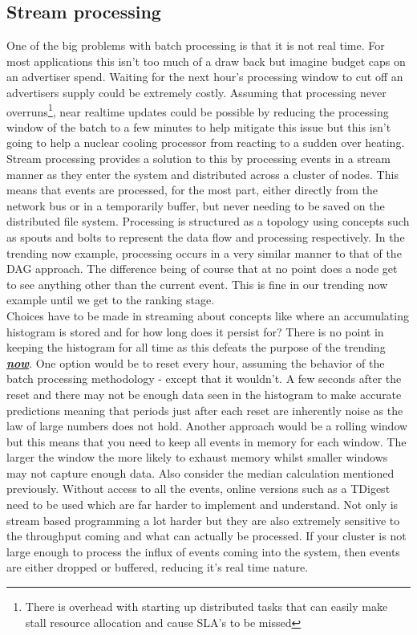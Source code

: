 \documentclass[a4paper,11pt]{scrreprt}
\begin{document}
\subsection{Stream processing}
One of the big problems with batch processing is that it is not real time. For most applications this isn't too much of a draw back but imagine budget caps on an advertiser spend. Waiting for the next hour's processing window to cut off an advertisers supply could be extremely costly. Assuming that processing never overruns\footnote{There is overhead with starting up distributed tasks that can easily make stall resource allocation and cause SLA's to be missed}, near realtime updates could be possible by reducing the processing window of the batch to a few minutes to help mitigate this issue but this isn't going to help a nuclear cooling processor from reacting to a sudden over heating. Stream processing provides a solution to this by processing events in a stream manner as they enter the system and distributed across a cluster of nodes. This means that events are processed, for the most part, either directly from the network bus or in a temporarily buffer, but never needing to be saved on the distributed file system. Processing is structured as a topology using concepts such as spouts and bolts to represent the data flow and processing respectively. In the trending now example, processing occurs in a very similar manner to that of the DAG approach. The difference being of course that at no point does a node get to see anything other than the current event. This is fine in our trending now example until we get to the ranking stage. \\

Choices have to be made in streaming about concepts like where an accumulating histogram is stored and for how long does it persist for? There is no point in keeping the histogram for all time as this defeats the purpose of the trending \textbf{\textit{\underline{now}}}. One option would be to reset every hour, assuming the behavior of the batch processing methodology - except that it wouldn't. A few seconds after the reset and there may not be enough data seen in the histogram to make accurate predictions meaning that periods just after each reset are inherently noise as the law of large numbers does not hold. Another approach would be a rolling window but this means that you need to keep all events in memory for each window. The larger the window the more likely to exhaust memory whilst smaller windows may not capture enough data. Also consider the median calculation mentioned previously. Without access to all the events, online versions such as a TDigest\cite{tdigest} need to be used which are far harder to implement and understand. Not only is stream based programming a lot harder but they are also extremely sensitive to the throughput coming and what can actually be processed. If your cluster is not large enough to process the influx of events coming into the system, then events are either dropped or buffered, reducing it's real time nature.\\
\end{document}
